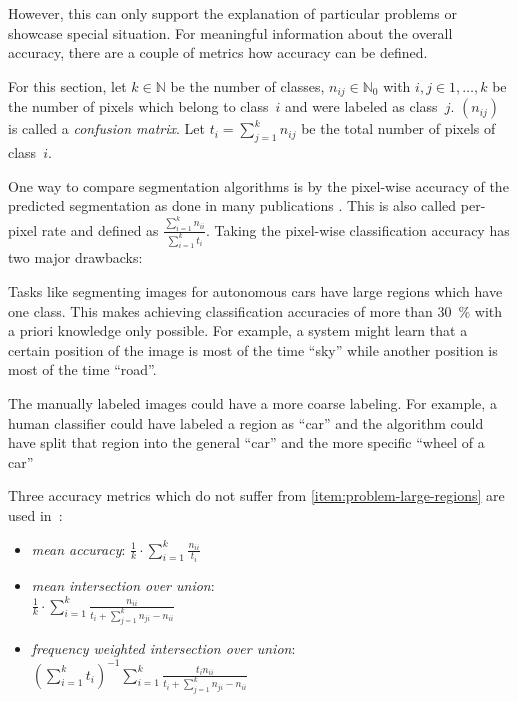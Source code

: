However, this can only support the explanation of particular problems or
showcase special situation. For meaningful information about the overall
accuracy, there are a couple of metrics how accuracy can be defined.

For this section, let $k \in \mathbb{N}$ be the number of classes, $n_{ij} \in
\mathbb{N}_0$ with $i,j \in 1, \dots, k$ be the number of pixels which belong
to class~$i$ and were labeled as class~$j$. $(n_{ij})$ is called a
\textit{confusion matrix}. Let $t_i = \sum_{j=1}^k n_{ij}$ be the total number
of pixels of class~$i$.

One way to compare segmentation algorithms is by the pixel-wise accuracy of the
predicted segmentation as done in many publications
\cite{shotton2006textonboost,csurka2008simple,long2014fully}. This is also
called per-pixel rate and defined as $\frac{\sum_{i=1}^k n_{ii}}{\sum_{i=1}^k
t_i}$. Taking the pixel-wise classification accuracy has two major drawbacks:

\begin{problemnr}
    \item \label{item:problem-large-regions} Tasks like segmenting images for
          autonomous cars have large regions which have one class. This makes
          achieving classification accuracies of more than \SI{30}{\percent}
          with a priori knowledge only possible. For example, a system might
          learn that a certain position of the image is most of the time
          \enquote{sky} while another position is most of the time
          \enquote{road}.
    \item \label{item:problem-labeling-granularity} The manually labeled images
          could have a more coarse labeling. For example, a human classifier
          could have labeled a region as
          \enquote{car} and the algorithm could have split that region into
          the general \enquote{car} and the more specific \enquote{wheel of a
          car}
\end{problemnr}
\goodbreak
Three accuracy metrics which do not suffer from
\cref{item:problem-large-regions} are used in~\cite{long2014fully}:\nobreak%
\begin{itemize}
    \item \textit{mean accuracy}: $\frac{1}{k} \cdot \sum_{i=1}^k \frac{n_{ii}}{t_i}$
    \item \textit{mean intersection over union}: \hfill\\$\frac{1}{k} \cdot \sum_{i=1}^k \frac{n_{ii}}{t_i + \sum_{j=1}^k n_{ji}-n_{ii}}$
    \item \textit{frequency weighted intersection over union}:
          ${({\sum_{i=1}^k t_i})}^{-1} \sum_{i=1}^k \frac{t_i n_{ii}}{t_i + \sum_{j=1}^k n_{ji} - n_{ii}}$
\end{itemize}

